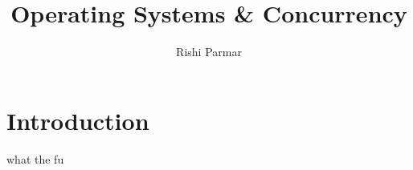 \documentclass{article}
\begin{document}
\title{Operating Systems \& Concurrency}
\author{Rishi Parmar}
\maketitle
\newpage
{}
\hypertarget{MyToc}{}
\tableofcontents
\newpage

\section{Introduction}
what the fu
\end{document}
